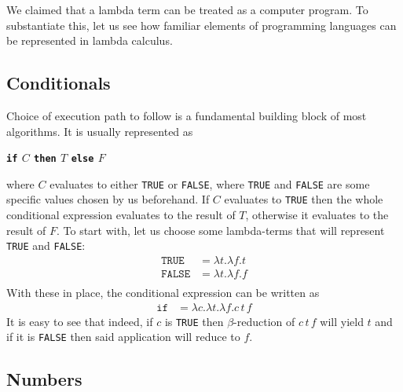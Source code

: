 \documentclass[11pt,twoside,a4paper]{article} %
\newcommand{\kw}[1]{\bf{\texttt{#1}}}
\newcommand{\sym}[1]{\texttt{#1}}
\newcommand{\msym}[1]{\mathtt{#1}}
\begin{document}
We claimed that a lambda term can be treated as a computer program. To substantiate 
this, let us see how familiar elements of programming languages can be represented 
in lambda calculus.

\subsection{Conditionals}

Choice of execution path to follow is a fundamental building block of most
algorithms. It is usually represented as 
\begin{center}
\kw{if} $C$ \kw{then} $T$ \kw{else} $F$
\end{center}
where $C$ evaluates to either \sym{TRUE} or \sym{FALSE}, where \sym{TRUE} and 
\sym{FALSE} are some specific values chosen by us beforehand. If $C$ evaluates 
to \sym{TRUE} then the whole conditional expression evaluates to the result of 
$T$, otherwise it evaluates to the result of $F$. To start with, let us choose 
some lambda-terms that will represent \sym{TRUE} and \sym{FALSE}:
\begin{align*}
\msym{TRUE}  &= \lambda t.\lambda f.t \\
\msym{FALSE} &= \lambda t.\lambda f.f \\
\end{align*}
With these in place, the conditional expression can be written as
\begin{align*}
\msym{if} &= \lambda c.\lambda t.\lambda f.c\,t\,f
\end{align*}
It is easy to see that indeed, if $c$ is \sym{TRUE} then $\beta$-reduction of
$c\,t\,f$ will yield $t$ and if it is \sym{FALSE} then said application will
reduce to $f$.

\subsection{Numbers}
\end{document}
